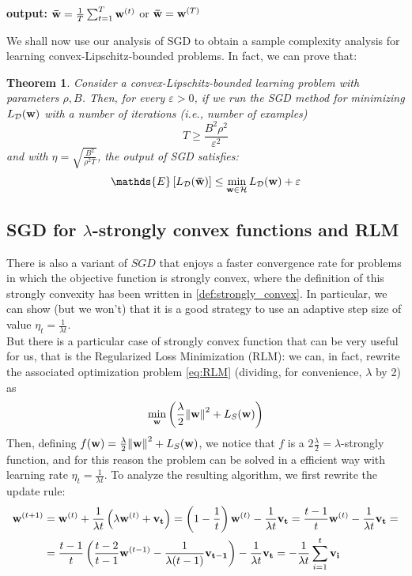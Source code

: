 \documentclass[12pt]{report}
\theoremstyle{plain}
\newtheorem{theorem}{Theorem}[chapter]
\newcommand\mcl[1]{\mathcal{#1}}
\begin{document}
\begin{flushleft}
\begin{tcolorbox}
	\textbf{output:} \qquad$\vb{\bar{w}} = \frac{1}{T}\sum_{t=1}^T \vb{w}^{(t)}$ \qquad  or \qquad $\vb{\bar{w}}=\vb{w}^{(T)}$\\
	
	\label{box:SGD_for_risk}
\end{tcolorbox}

We shall now use our analysis of SGD to obtain a sample complexity analysis for
learning convex-Lipschitz-bounded problems. In fact, we can prove that:
\begin{theorem}
	Consider a convex-Lipschitz-bounded learning problem with parameters $\rho, B$. Then, for every $\varepsilon>0$, if we run the SGD method for minimizing $L_\mcl{D}(\vb{w}) $ with a number of iterations (i.e., number of examples)
	\[ T\geq\frac{B^2\rho^2}{\varepsilon^2} \]
	and with $\eta = \sqrt{\frac{B^2}{\rho^2T}}$, the output of SGD satisfies:
	\[ \mathds{E}\left[L_\mcl{D}(\vb{\bar{w}})\right]\leq\min_{\vb{w}\in\mcl{H}}L_\mcl{D}(\vb{w})+\varepsilon \]
\end{theorem}

\subsection{SGD for $\lambda$-strongly convex functions and RLM}
There is also a variant of $SGD$ that enjoys a faster convergence rate for problems in which the objective function is strongly convex, where the definition of this strongly convexity has been written in \ref{def:strongly_convex}. In particular, we can show (but we won't) that it is a good strategy to use an adaptive step size of value $\eta_t=\frac{1}{\lambda t}$.\\
But there is a particular case of strongly convex function that can be very useful for us, that is the Regularized Loss Minimization (RLM): we can, in fact, rewrite the associated optimization problem \ref{eq:RLM} (dividing, for convenience, $\lambda$ by 2) as 
\[ \min_{\vb{w}}\left(\frac{\lambda}{2}\norm{\vb{w}}^2+L_S(\vb{w})\right) \]
Then, defining $f(\vb{w})=\frac{\lambda}{2}\norm{\vb{w}}^2+L_S(\vb{w})$, we notice that $f$ is a $2\frac{\lambda}{2}=\lambda$-strongly function, and for this reason the problem can be solved in a efficient way with learning rate $\eta_t=\frac{1}{\lambda t}$. To analyze the resulting algorithm, we first rewrite the update rule:
\[ \begin{aligned} \vb{w}^{(t+1)} &= \vb{w}^{(t)}+\frac{1}{\lambda t}\left(\lambda\vb{w}^{(t)}+\vb{v_t}\right) = \left(1-\frac{1}{t}\right)\vb{w}^{(t)}-\frac{1}{\lambda t}\vb{v_t}=\frac{t-1}{t}\vb{w}^{(t)} -\frac{1}{\lambda t}\vb{v_t} =\\
&= \frac{t-1}{t}\left(\frac{t-2}{t-1}\vb{w}^{(t-1)}-\frac{1}{\lambda(t-1)}\vb{v_{t-1}}\right) -\frac{1}{\lambda t}\vb{v_t} = -\frac{1}{\lambda t}\sum_{i=1}^t\vb{v_i}
\end{aligned} \]


\end{flushleft}
\end{document}
